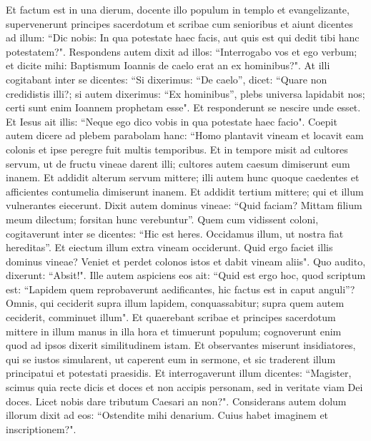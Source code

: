 \begin{biblechapter}  
\verse Et factum est in una dierum, docente illo populum in templo et evangelizante, supervenerunt principes sacerdotum et scribae cum senioribus  
\verse et aiunt dicentes ad illum: “Dic nobis: In qua potestate haec facis, aut quis est qui dedit tibi hanc potestatem?". 
\verse Respondens autem dixit ad illos: “Interrogabo vos et ego verbum; et dicite mihi: 
\verse Baptismum Ioannis de caelo erat an ex hominibus?". 
\verse At illi cogitabant inter se dicentes: “Si dixerimus: “De caelo”, dicet: “Quare non credidistis illi?; 
\verse si autem dixerimus: “Ex hominibus”, plebs universa lapidabit nos; certi sunt enim Ioannem prophetam esse". 
\verse Et responderunt se nescire unde esset. 
\verse Et Iesus ait illis: “Neque ego dico vobis in qua potestate haec facio". 
\verse Coepit autem dicere ad plebem parabolam hanc: “Homo plantavit vineam et locavit eam colonis et ipse peregre fuit multis temporibus. 
\verse Et in tempore misit ad cultores servum, ut de fructu vineae darent illi; cultores autem caesum dimiserunt eum inanem. 
\verse Et addidit alterum servum mittere; illi autem hunc quoque caedentes et afficientes contumelia dimiserunt inanem. 
\verse Et addidit tertium mittere; qui et illum vulnerantes eiecerunt. 
\verse Dixit autem dominus vineae: “Quid faciam? Mittam filium meum dilectum; forsitan hunc verebuntur”. 
\verse Quem cum vidissent coloni, cogitaverunt inter se dicentes: “Hic est heres. Occidamus illum, ut nostra fiat hereditas”. 
\verse Et eiectum illum extra vineam occiderunt. Quid ergo faciet illis dominus vineae? 
\verse Veniet et perdet colonos istos et dabit vineam aliis". Quo audito, dixerunt: “Absit!". 
\verse Ille autem aspiciens eos ait: “Quid est ergo hoc, quod scriptum est: “Lapidem quem reprobaverunt aedificantes, hic factus est in caput anguli”? 
\verse Omnis, qui ceciderit supra illum lapidem, conquassabitur; supra quem autem ceciderit, comminuet illum". 
\verse Et quaerebant scribae et principes sacerdotum mittere in illum manus in illa hora et timuerunt populum; cognoverunt enim quod ad ipsos dixerit similitudinem istam. 
\verse Et observantes miserunt insidiatores, qui se iustos simularent, ut caperent eum in sermone, et sic traderent illum principatui et potestati praesidis.  
\verse Et interrogaverunt illum dicentes: “Magister, scimus quia recte dicis et doces et non accipis personam, sed in veritate viam Dei doces. 
\verse Licet nobis dare tributum Caesari an non?". 
\verse Considerans autem dolum illorum dixit ad eos: 
\verse “Ostendite mihi denarium. Cuius habet imaginem et inscriptionem?".  

\end{biblechapter}
